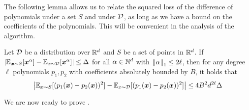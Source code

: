 \documentclass[11pt]{article} %
\numberwithin{equation}{section}
\begin{document}




The following lemma allows us to relate the squared loss of the difference of polynomials under a set $S$ and under ${\mathcal{D}}$, as long as we have a bound on the coefficients of the polynomials. This will be convenient in the analysis of the algorithm.
\begin{lemma}\label{transfer_lemma}
    Let ${\mathcal{D}}$ be a distribution over $\mathbb{R}^d$ and $S$ be a set of points in $\mathbb{R}^d$. If $|\mathbb{E}_{{\bm{x}} \sim S}[{\bm{x}}^\alpha] - \mathbb{E}_{x \sim {\mathcal{D}}}[{\bm{x}}^\alpha]| \le \Delta$ for all $\alpha \in \mathbb{N}^d$ with $\left\| \alpha \right\|_1 \le 2\ell$, then for any degree $\ell$ polynomials $p_1, p_2$ with coefficients absolutely bounded by $B$, it holds that
    \[
    \left| \mathbb{E}_{{\bm{x}} \sim S}[(p_1({\bm{x}}) - p_2({\bm{x}}))^2] - \mathbb{E}_{x \sim {\mathcal{D}}}[(p_1({\bm{x}}) - p_2({\bm{x}}))^2] \right|\le 4B^2 d^{2\ell} \Delta
    \]
\end{lemma}
We are now ready to prove .
\end{document}
